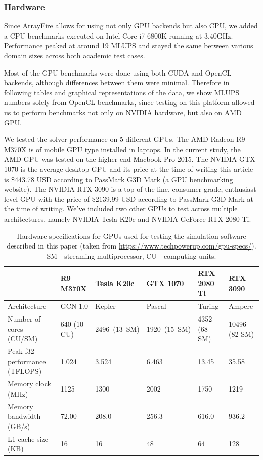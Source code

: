 \subsubsection{Hardware}
Since ArrayFire allows for using not only GPU backends but also CPU, we added a CPU benchmarks executed on Intel Core i7 6800K running at 3.40GHz. Performance peaked at around 19 MLUPS and stayed the same between various domain sizes across both academic test cases.

Most of the GPU benchmarks were done using both CUDA and OpenCL backends, although differences between them were minimal. Therefore in following tables and graphical representations of the data, we show MLUPS numbers solely from OpenCL benchmarks, since testing on this platform allowed us to perform benchmarks not only on NVIDIA hardware, but also on AMD GPU.

We tested the solver performance on 5 different GPUs. The AMD Radeon R9 M370X is of mobile GPU type installed in laptops. In the current study, the AMD GPU was tested on the higher-end Macbook Pro 2015. The NVIDIA GTX 1070 is the average desktop GPU and its price at the time of writing this article is \$443.78 USD according to PassMark G3D Mark (a GPU benchmarking website). The NVIDIA RTX 3090 is a top-of-the-line, consumer-grade, enthusiast-level GPU with the price of \$2139.99 USD according to PassMark G3D Mark at the time of writing. We've included two other GPUs to test across multiple architectures, namely NVIDIA Tesla K20c and NVIDIA GeForce RTX 2080 Ti.

\begin{table}[!ht]
	\centering
	\begin{tabular}{ |p{4.9cm}||p{2cm}|p{2cm}|p{2cm}|p{2.1cm}|p{2.2cm}| }
		\hline
		& R9 M370X & Tesla K20c & GTX 1070 & RTX 2080 Ti & RTX 3090 \\
		\hline
		Architecture   & GCN 1.0 & Kepler & Pascal  & Turing &  Ampere  \\
		Number of cores (CU/SM)   & 640 (10 CU) & 2496~(13~SM) & 1920~(15~SM)   &  4352 (68 SM) &  10496 (82 SM) \\
		Peak f32 performance (TFLOPS)   & 1.024  & 3.524 & 6.463  & 13.45 &  35.58 \\
		Memory clock (MHz)   & 1125  & 1300 & 2002   & 1750 &   1219 \\
		Memory bandwidth (GB/s)   & 72.00  & 208.0  & 256.3   & 616.0 &   936.2 \\
		L1 cache size (KB)   & 16  & 16  & 48   & 64 &   128 \\
		\hline
	\end{tabular}
	\caption{Hardware specifications for GPUs used for testing the simulation software described in this paper (taken from \url{https://www.techpowerup.com/gpu-specs/}). SM - streaming multiprocessor, CU - computing units.}
	\label{tab:gpus}
\end{table}

